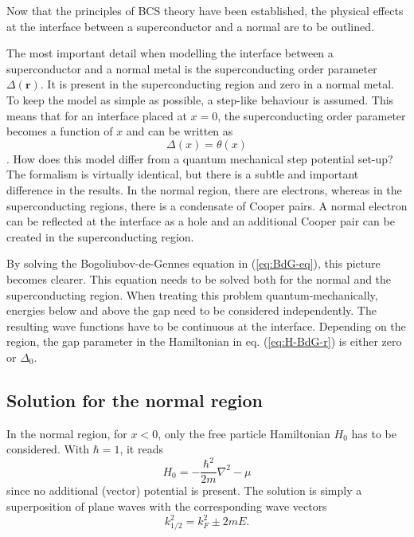 Now that the principles of BCS theory have been established, the physical effects at the interface between a superconductor and a normal are to be outlined.

The most important detail when modelling the interface between a superconductor and a normal metal is the superconducting order parameter $\Delta \left( \mathbf{r} \right)$. It is present in the superconducting region and zero in a normal metal. To keep the model as simple as possible, a step-like behaviour is assumed. This means that for an interface placed at $x=0$, the superconducting order parameter becomes a function of $x$ and can be written as
\begin{equation}
\Delta \left( x \right) = \theta \left(x \right)
\end{equation}.
How does this model differ from a quantum mechanical step potential set-up? The formalism is virtually identical, but there is a subtle and important difference in the results. In the normal region, there are electrons, whereas in the superconducting regions, there is a condensate of Cooper pairs. A normal electron can be reflected at the interface as a hole and an additional Cooper pair can be created in the superconducting region.

By solving the Bogoliubov-de-Gennes equation in (\ref{eq:BdG-eq}), this picture becomes clearer.  This equation needs to be solved both for the normal and the superconducting region. When treating this problem quantum-mechanically, energies below and above the gap need to be considered independently. The resulting wave functions have to be continuous at the interface. Depending on the region, the gap parameter in the Hamiltonian in eq. (\ref{eq:H-BdG-r}) is either zero or $\Delta_0$.

\subsection{Solution for the normal region}\label{sec:normal-region}
In the normal region, for $x < 0$, only the free particle Hamiltonian $H_0$ has to be considered. With $\hbar = 1$, it reads
\begin{equation}
H_0 = - \frac{\hbar^2}{2m} \nabla^2 - \mu 
\end{equation}
since no additional (vector) potential is present. The solution is simply a superposition of plane waves with the corresponding wave vectors
\begin{equation}
k_{1/2}^2 = k_F^2 \pm 2mE \label{eq:k-normal}.
\end{equation}

